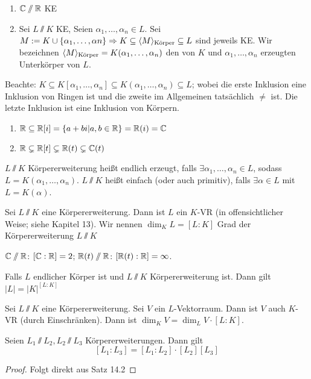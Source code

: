 \documentclass[12pt,a4paper]{scrartcl}
\begin{document}
\begin{bsp}
	\leavevmode
	\begin{enumerate}
		\item $\mathbb C\sslash\mathbb R$ KE
		\item Sei $L\sslash K$ KE, Seien $\alpha_1, \dots, \alpha_n\in L$. Sei $M:=K\cup \{\alpha_1,\dots, \alpha n\}\Rightarrow K \subseteq \langle M\rangle_{\text{Körper}}\subseteq L$ sind jeweils KE. Wir bezeichnen $\langle M\rangle_{\text{Körper}} = K(\alpha_1,\dots, \alpha_n)$ den von $K$ und $\alpha_1,\dots,\alpha_n$ erzeugten Unterkörper von $L$.
	\end{enumerate}
\end{bsp}
Beachte: $K\subseteq K[\alpha_1,\dots, \alpha_n]\subseteq K(\alpha_1,\dots, \alpha_n)\subseteq L$; wobei die erste Inklusion eine Inklusion von Ringen ist und die zweite im Allgemeinen tatsächlich $\neq$ ist. Die letzte Inklusion ist eine Inklusion von Körpern.

\begin{bsp}
	\leavevmode
	\begin{enumerate}
		\item $\mathbb R\subseteq \mathbb R[i] = \{a+bi|a,b\in\mathbb R\} = \mathbb R(i) = \mathbb C$
		\item $\mathbb R\subsetneq \mathbb R[t]\subsetneq \mathbb R(t) \subsetneq \mathbb C(t)$
	\end{enumerate}
\end{bsp}

\begin{defi}
	$L\sslash K$ Körpererweiterung heißt endlich erzeugt, falls $\exists \alpha_1,\dots, \alpha_n\in L$, sodass $L = K(\alpha_1,\dots, \alpha_n)$. $L\sslash K$ heißt einfach (oder auch primitiv), falls $\exists \alpha\in L$ mit $L = K(\alpha)$.
\end{defi}

\begin{defi}
	Sei $L\sslash K$ eine Körpererweiterung. Dann ist $L$ ein $K$-VR (in offensichtlicher Weise; siehe Kapitel 13). Wir nennen $\dim_KL = [L:K]$ Grad der Körpererweiterung $L\sslash K$
\end{defi}

\begin{bsp}
	$\mathbb C\sslash\mathbb R$: $[\mathbb C:\mathbb R] = 2$; $\mathbb R(t)\sslash \mathbb R$: $[\mathbb R(t): \mathbb R] = \infty$.
\end{bsp}
\begin{bem}
	Falls $L$ endlicher Körper ist und $L\sslash K$ Körpererweiterung ist. Dann gilt $|L| = |K|^{ [L:K]}$
\end{bem}
\begin{satz}
	Sei $L\sslash K$ eine Körpererweiterung. Sei $V$ ein $L$-Vektorraum. Dann ist $V$ auch $K$-VR (durch Einschränken). Dann ist $\dim_KV= \dim_LV\cdot [L:K]$.
\end{satz}
\begin{kor}[Gradformel]
	Seien $L_1\sslash L_2, L_2\sslash L_3$ Körpererweiterungen. Dann gilt
	$$ [L_1: L_3] = [L_1:L_2]\cdot [L_2][L_3]$$
\end{kor}
\begin{proof} Folgt direkt aus Satz 14.2
\end{proof}
\end{document}
